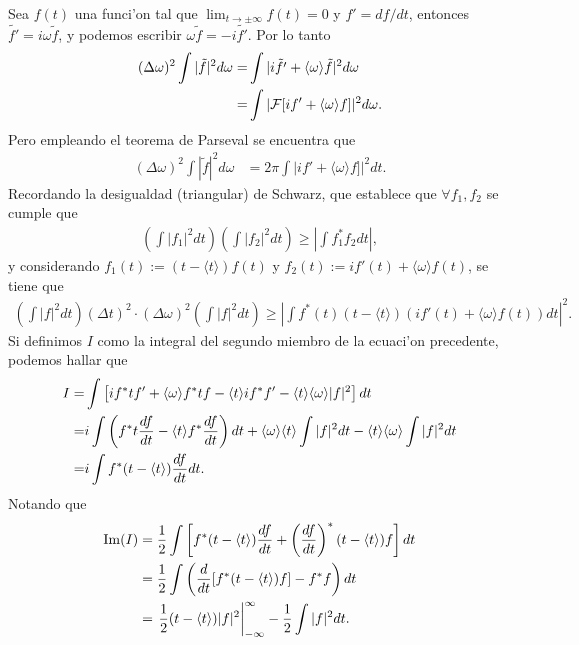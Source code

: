 Sea $f(t)$ una funci'on tal que $\lim_{t \rightarrow \pm \infty} f(t)=0$ y $f'=df/dt$, entonces $\tilde{f'}=i \omega \tilde{f}$, y podemos escribir $\omega \tilde{f}=-i \tilde{f'}$. Por lo tanto
\begin{align}
(\Delta \omega)^2 \int |\tilde{f}|^2 d\omega =&\int |i\tilde{f'}+\langle \omega \rangle \tilde{f}|^2 d \omega \notag \\
=&\int |{\cal F}[if'+\langle \omega \rangle f]|^2 d\omega.
\end{align}
Pero empleando el teorema de Parseval se encuentra que
\begin{align}
(\Delta \omega)^2 \int |\tilde{f}|^2 d\omega &= 2\pi\int |if'+\langle \omega \rangle f]|^2 dt.
\end{align}
Recordando la desigualdad (triangular) de Schwarz, que establece que $\forall f_{1},f_{2}$ se cumple que
\begin{align}
\left( \int |f_{1}|^2 dt \right)\left( \int |f_{2}|^2 dt\right) \geq \left|\int f_{1}^{*}f_{2}dt\right|,
\end{align}
y considerando $f_{1}(t):=(t-\langle t \rangle)f(t)$ y $f_{2}(t):=if'(t)+\langle \omega \rangle f(t)$, se tiene que
\begin{align}
\left(\int |f|^2 dt \right) (\Delta t)^2 \cdot (\Delta \omega)^2 \left(\int |f|^2 dt \right)\geq
\left|\int f^{*}(t)(t-\langle t \rangle)\left(if'(t)+ \langle\omega\rangle f(t)\right) dt\right|^2.
\end{align}
Si definimos $I$ como la integral del segundo miembro de la ecuaci'on precedente, podemos hallar que
\begin{align}
I=&\int \left[ i f^{*}t f'+\langle \omega \rangle f^{*} t f-\langle t \rangle i f^{*}f'-\langle t \rangle \langle \omega \rangle |f|^2\right]dt  \notag \\
=&i\int \left(f^{*} t \frac{df}{dt}-\langle t \rangle f^{*} \frac{df}{dt} \right) dt+\langle \omega \rangle \langle t \rangle \int |f|^2 dt-\langle t \rangle \langle \omega \rangle \int |f|^2 dt\notag \\
=&i \int f^{*}(t-\langle t\rangle)\frac{df}{dt} dt.
\end{align}
Notando que
\begin{align}
{\rm Im}(I) &= \frac{1}{2}\int \left[ f^{*}(t-\langle t \rangle)\frac{df}{dt}+\left(\frac{df}{dt}\right)^{*}(t-\langle t \rangle)f\right]dt\notag \\
&= \frac{1}{2}\int \left( \frac{d}{dt}[f^{*}(t-\langle t \rangle)f]-f^{*}f\right)dt\notag \\
&= \left. \frac{1}{2} (t-\langle t \rangle)|f|^2 \right|_{-\infty}^{\infty}-\frac{1}{2}\int |f|^2 dt.
\end{align}
